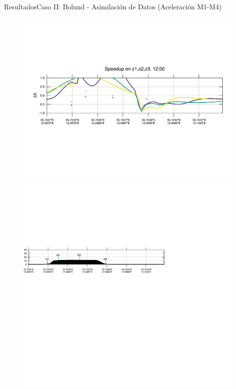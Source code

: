 \documentclass[mathserif,10pt]{beamer}
\begin{document}
\begin{frame}{Resultados}{Caso II: Bolund - Asimilación de Datos (Aceleración M1-M4)}
\begin{figure}[H]
		\includegraphics[width=0.65\linewidth,trim={12mm 84mm 10mm 74mm},page=37,clip]{fig/06/bol_da/speedup}\\%
		\includegraphics[width=0.65\linewidth,trim={-11mm 193mm 115mm 112mm},clip]{fig/06/bol/cross_height}\\%
		\label{fig:06_bol_da_speedup}
	\end{figure}
\end{frame}
\end{document}
